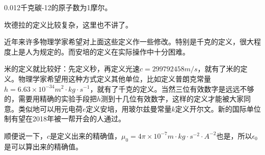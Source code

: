0.012千克碳-12的原子数为1摩尔。

坎德拉的定义比较复杂，这里也不讲了。

近年来许多物理学家希望对上面这些定义作一些修改。特别是千克的定义，很大程度上是人为规定的。而安培的定义在实际操作中十分困难。

米的定义就比较好：先定义秒，再定义光速$c=299792458 \unit{m/s}$，就有了米的定义。物理学家希望用这种方式定义其他单位，比如定义普朗克常量$h=6.63 \times 10^{-34} \unit{m^2 \cdot kg \cdot s^{-1}}$，就有了千克的定义。当然三位有效数字是远远不够的，需要用精确的实验手段把$h$测到十几位有效数字，这样的定义才能被大家同意。类似地可以用元电荷$e$定义安培，用玻尔兹曼常量$k$定义开尔文。新的国际单位制有望在2018年被一帮开会的人通过。

顺便说一下，$c$是定义出来的精确值，$\mu_0=4 \pi \times 10^{-7} \unit{m \cdot kg \cdot s^{-2} \cdot A^{-2}}$也是，所以$\epsilon_0$是可以算出来的精确值。
